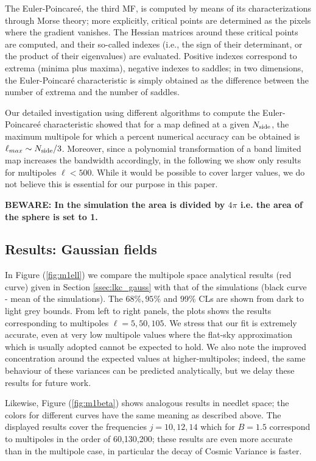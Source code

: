\documentclass[aps,prd,showpacs,superscriptaddress,groupedaddress]{revtex4-1}  %
\newcommand{\figref}[1]{Figure (\ref{#1})}
\newcommand{\secref}[1]{Section \ref{#1}}
\begin{document}
The Euler-Poincare\'{e}, the third MF, is computed by means of its
characterizations through Morse theory; more explicitly, critical
points are determined as the pixels where the gradient vanishes.
The Hessian matrices around these critical points are computed,
and their so-called indexes (i.e., the sign of their determinant,
or the product of their eigenvalues) are evaluated. Positive
indexes correspond to extrema (minima plus maxima), negative
indexes to saddles; in two dimensions, the Euler-Poincar\'{e}
characteristic is simply obtained as the difference between the
number of extrema and the number of saddles. 

Our detailed investigation using different algorithms to compute the
Euler-Poincare\'{e} characteristic showed that for a map defined at a
given $N_{\rm side}$, the maximum multipole for which a percent
numerical accuracy can be obtained is $\ell_{max} \sim N_{\rm
  side}/3$. Moreover, since a polynomial transformation of a band
limited map increases the bandwidth accordingly, in the following we
show only results for multipoles $\ell<500$. While it would be
possible to cover larger values, we do not believe this is
essential for our purpose in this paper.


{\bf BEWARE: In the simulation the area is divided by $4\pi$ i.e. the
  area of the sphere is set to 1. }


\subsection*{Results: Gaussian fields}

In \figref{fig:m1ell} we compare the multipole space analytical
results (red curve) given in \secref{ssec:lkc_gauss} with that of
the simulations (black curve - mean of the simulations). The
$68\%,95\%$ and $99\%$ CLs are shown from dark to light grey
bounds. From left to right panels, the plots shows the results
corresponding to multipoles $\ell=5,50,105$. We stress that our
fit is extremely accurate, even at very low multipole values where
the flat-sky approximation which is usually adopted cannot be
expected to hold.  We also note the improved concentration around
the expected values at higher-multipoles; indeed, the same
behaviour of these variances can be predicted analytically, but we
delay these results for future work.

Likewise, \figref{fig:m1beta} shows analogous results in needlet
space; the colors for different curves have the same meaning as
described above. The displayed results cover the frequencies
$j=10,12,14$  which for $B=1.5$  correspond to multipoles in the order of
60,130,200; these results are even more accurate than in the
multipole case, in particular the decay of Cosmic Variance is
faster.
\end{document}
